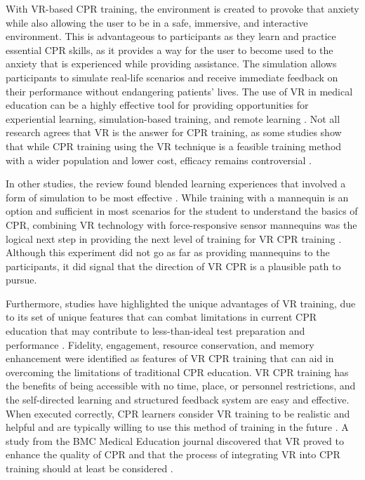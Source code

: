 \documentclass[manuscript]{./Models/acmart}
\begin{document}
With VR-based CPR training, the environment is created to provoke that anxiety while also allowing the user to be in a safe, immersive, and interactive environment. This is advantageous to participants as they learn and practice essential CPR skills, as it provides a way for the user to become used to the anxiety that is experienced while providing assistance. The simulation allows participants to simulate real-life scenarios and receive immediate feedback on their performance without endangering patients' lives. The use of VR in medical education can be a highly effective tool for providing opportunities for experiential learning, simulation-based training, and remote learning \cite{pottle-2019}. Not all research agrees that VR is the answer for CPR training, as some studies show that while CPR training using the VR technique is a feasible training method with a wider population and lower cost, efficacy remains controversial \cite{zheng-2022}.

In other studies, the review found blended learning experiences that involved a form of simulation to be most effective \cite{lactona-2021, cason-2011}. While training with a mannequin is an option and sufficient in most scenarios for the student to understand the basics of CPR, combining VR technology with force-responsive sensor mannequins was the logical next step in providing the next level of training for VR CPR training \cite{fierros-2021}. Although this experiment did not go as far as providing mannequins to the participants, it did signal that the direction of VR CPR is a plausible path to pursue.

Furthermore, studies have highlighted the unique advantages of VR training, due to its set of unique features that can combat limitations in current CPR education that may contribute to less-than-ideal test preparation and performance \cite{wong-2018}. Fidelity, engagement, resource conservation, and memory enhancement were identified as features of VR CPR training that can aid in overcoming the limitations of traditional CPR education. VR CPR training has the benefits of being accessible with no time, place, or personnel restrictions, and the self-directed learning and structured feedback system are easy and effective. When executed correctly, CPR learners consider VR training to be realistic and helpful and are typically willing to use this method of training in the future \cite{balian-2019}. A study from the BMC Medical Education journal discovered that VR proved to enhance the quality of CPR and that the process of integrating VR into CPR training should at least be considered \cite{moll-khosrawi-2022}.
\end{document}
